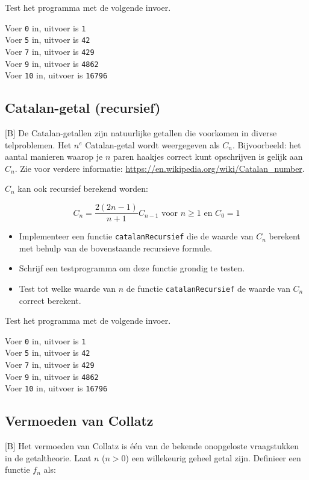 \documentclass[a4paper,10pt,fleqn,twoside]{article}
\begin{document}
Test het programma met de volgende invoer.

Voer \lstinline|0| in, uitvoer is \lstinline|1|\\
Voer \lstinline|5| in, uitvoer is \lstinline|42|\\
Voer \lstinline|7| in, uitvoer is \lstinline|429|\\
Voer \lstinline|9| in, uitvoer is \lstinline|4862|\\
Voer \lstinline|10| in, uitvoer is \lstinline|16796|

\subsection{Catalan-getal (recursief)}[B]
De Catalan-getallen zijn natuurlijke getallen die voorkomen in diverse telproblemen. Het $n^e$ Catalan-getal wordt weergegeven als $C_n$. Bijvoorbeeld: het aantal manieren waarop je $n$ paren haakjes correct kunt opschrijven is gelijk aan $C_n$. Zie voor verdere informatie: \url{https://en.wikipedia.org/wiki/Catalan_number}.

$C_n$ kan ook recursief berekend worden:

\begin{equation*}
C_n = \dfrac{2(2n-1)}{n+1}C_{n-1} \text{ voor } n \geq 1 \text{ en } C_0=1
\end{equation*}

\begin{itemize}
\item Implementeer een functie \lstinline|catalanRecursief| die de waarde van $C_n$ berekent met behulp van de bovenstaande recursieve formule.
\item Schrijf een testprogramma om deze functie grondig te testen.
\item Test tot welke waarde van $n$ de functie \lstinline|catalanRecursief| de waarde van $C_n$ correct berekent.
\end{itemize}

Test het programma met de volgende invoer.

Voer \lstinline|0| in, uitvoer is \lstinline|1|\\
Voer \lstinline|5| in, uitvoer is \lstinline|42|\\
Voer \lstinline|7| in, uitvoer is \lstinline|429|\\
Voer \lstinline|9| in, uitvoer is \lstinline|4862|\\
Voer \lstinline|10| in, uitvoer is \lstinline|16796|

\subsection{Vermoeden van Collatz}[B]
Het vermoeden van Collatz is één van de bekende onopgeloste vraagstukken in de getaltheorie.
Laat $n$ ($n>0$) een willekeurig geheel getal zijn. Definieer een functie $f_n$ als:
\end{document}
